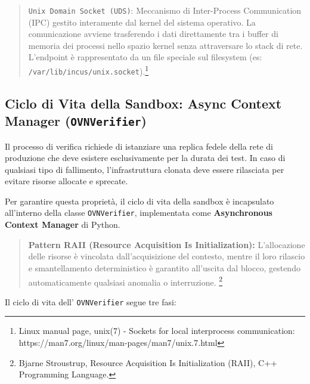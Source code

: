 \begin{quote}
\passthrough{\lstinline!Unix Domain Socket (UDS)!}: Meccanismo di
Inter-Process Communication (IPC) gestito interamente dal kernel del
sistema operativo. La comunicazione avviene trasferendo i dati
direttamente tra i buffer di memoria dei processi nello spazio kernel
senza attraversare lo stack di rete. L'endpoint è rappresentato da un
file speciale sul filesystem (es:
\passthrough{\lstinline!/var/lib/incus/unix.socket!}).\footnote{\label{fn:ref_21}Linux
  manual page, unix(7) - Sockets for local interprocess communication:
  https://man7.org/linux/man-pages/man7/unix.7.html}
\end{quote}

\subsection{\texorpdfstring{Ciclo di Vita della Sandbox: Async Context
Manager
(\texttt{OVNVerifier})}{Ciclo di Vita della Sandbox: Async Context Manager (OVNVerifier)}}\label{ciclo-di-vita-della-sandbox-async-context-manager-ovnverifier}

Il processo di verifica richiede di istanziare una replica fedele della
rete di produzione che deve esistere esclusivamente per la durata dei
test. In caso di qualsiasi tipo di fallimento, l'infrastruttura clonata
deve essere rilasciata per evitare risorse allocate e sprecate.

Per garantire questa proprietà, il ciclo di vita della sandbox è
incapsulato all'interno della classe
\passthrough{\lstinline!OVNVerifier!}, implementata come
\textbf{Asynchronous Context Manager} di Python.

\begin{quote}
\textbf{Pattern RAII (Resource Acquisition Is Initialization):}
L'allocazione delle risorse è vincolata dall'acquisizione del contesto,
mentre il loro rilascio e smantellamento deterministico è garantito
all'uscita dal blocco, gestendo automaticamente qualsiasi anomalia o
interruzione. \footnote{\label{fn:ref_22}Bjarne Stroustrup, Resource Acquisition Is
  Initialization (RAII), C++ Programming Language.}
\end{quote}

Il ciclo di vita dell' \passthrough{\lstinline!OVNVerifier!} segue tre
fasi:

